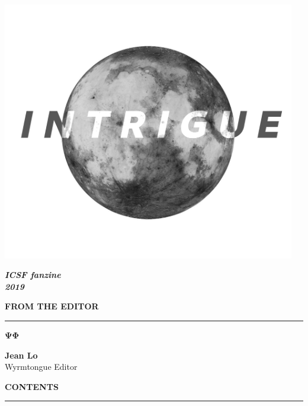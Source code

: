 \documentclass[a4paper,12pt]{article}
\newcommand{\tombstone}[0]{$\mathbf{\Psi\!\Phi}$}
\begin{document}
\vspace*{15mm}
\begin{center}
  \includegraphics[width=0.96\textwidth]{img/cover-italics.png}
\end{center}
\vfill
\begin{flushright}
  {\large \textbf{\textit{ICSF fanzine\\[0.2em]2019\phantom{.}}}}
\end{flushright}
\clearpage

\newcommand{\ctth}[1]{
  {\Large \textbf{\uppercase{#1}}} \par
  \hrule
  \vspace{0.5\baselineskip}
}

\newcommand{\shorthline}{
  \vspace{0.2\baselineskip}
  \begin{center}\rule{0.1\textwidth}{0.4pt}\end{center}
  \vspace{0.7\baselineskip}
}

\ctth{From the Editor}
 \tombstone

\hspace{0.7\textwidth} \parbox{48mm}{
    {\large \textbf{Jean Lo}} \\[-0.1em]
{\small Wyrmtongue Editor}
  }

\vspace{0.5\baselineskip}
\ctth{Contents}
\end{document}
